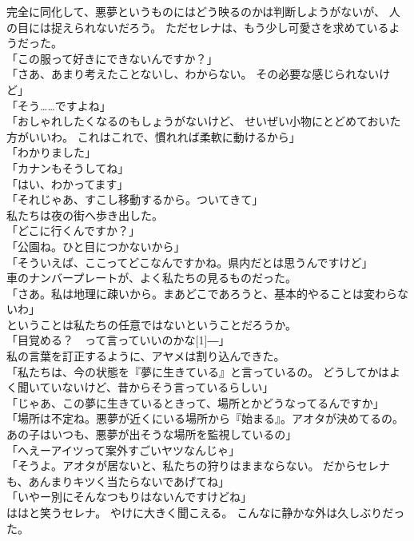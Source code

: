 \documentclass[../IHMain]{subfiles}
\begin{document}
完全に同化して、悪夢というものにはどう映るのかは判断しようがないが、
人の目には捉えられないだろう。
ただセレナは、もう少し可愛さを求めているようだった。\\
「この服って好きにできないんですか？」\\
「さあ、あまり考えたことないし、わからない。
その必要な感じられないけど」\\
「そう……ですよね」\\
「おしゃれしたくなるのもしょうがないけど、
せいぜい小物にとどめておいた方がいいわ。
これはこれで、慣れれば柔軟に動けるから」\\
「わかりました」\\
「カナンもそうしてね」\\
「はい、わかってます」\\
「それじゃあ、すこし移動するから。ついてきて」\\
私たちは夜の街へ歩き出した。\\
「どこに行くんですか？」\\
「公園ね。ひと目につかないから」\\
「そういえば、ここってどこなんですかね。県内だとは思うんですけど」\\
車のナンバープレートが、よく私たちの見るものだった。\\
「さあ。私は地理に疎いから。まあどこであろうと、基本的やることは変わらないわ」\\
ということは私たちの任意ではないということだろうか。\\
「目覚める？　って言っていいのかな\scalebox{3}[1]{―}」\\
私の言葉を訂正するように、アヤメは割り込んできた。\\
「私たちは、今の状態を『夢に生きている』と言っているの。
どうしてかはよく聞いていないけど、昔からそう言っているらしい」\\
「じゃあ、この夢に生きているときって、場所とかどうなってるんですか」\\
「場所は不定ね。悪夢が近くにいる場所から『始まる』。アオタが決めてるの。
あの子はいつも、悪夢が出そうな場所を監視しているの」\\
「へえーアイツって案外すごいヤツなんじゃ」\\
「そうよ。アオタが居ないと、私たちの狩りはままならない。
だからセレナも、あんまりキツく当たらないであげてね」\\
「いやー別にそんなつもりはないんですけどね」\\
ははと笑うセレナ。
やけに大きく聞こえる。
こんなに静かな外は久しぶりだった。
\end{document}

